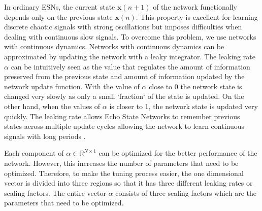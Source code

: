    In ordinary ESNs, the current state $\mathbf{x}(n+1)$ of the network functionally depends only on the previous state $\mathbf{x}(n)$. This property is excellent for learning discrete chaotic signals with strong oscillations but imposes difficulties when dealing with continuous slow signals. To overcome this problem, we use networks with continuous dynamics.  Networks with continuous dynamics can be approximated by updating the network with a leaky integrator. The leaking rate $\alpha$ can be intuitively seen as the value that regulates  the amount of information preserved from the previous state and amount of information updated by the network update function. 
   With the value of $\alpha$ close to 0 the network state is changed very slowly as only a small ‘fraction‘ of the state is updated. On the other hand, when the values of $\alpha$ is closer to 1, the network state is updated very quickly. The leaking rate allows Echo State Networks to remember previous states across multiple update cycles allowing the network to learn continuous signals with long periods \cite{EchoStatesTechRep,erodriguez}.



 
Each component of $\alpha \in \mathbb{R}^{N\times 1}$ can be optimized for the better performance of the network. However, this increases the number of parameters that need to be optimized. Therefore, to make the tuning process easier, the one dimensional vector is divided into three regions so that it has three different leaking rates or scaling factors. The entire vector $\alpha$ consists of three scaling factors which are the parameters that need to be optimized.
   

